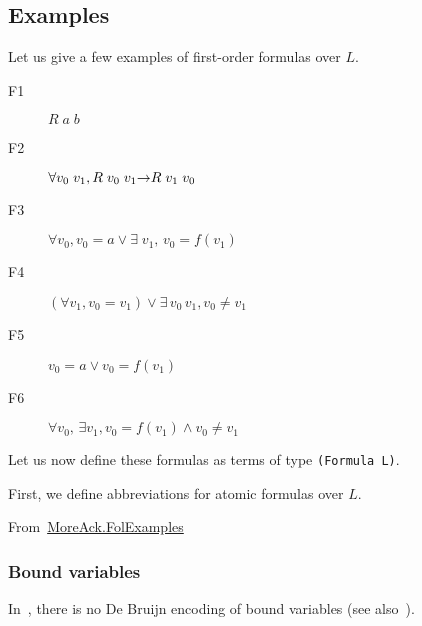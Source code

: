 \subsection{Examples}




Let us give a few examples of first-order formulas over $L$.
\label{fol:examplesf1f2f3}
\begin{description}
\item[F1] $R\;a\;b$
\item[F2] $\forall v_0\; v_1, R\;v_0\;v_1 \mbox{$\rightarrow$} R\;v_1\;v_0$
\item[F3] $ \forall v_0, v_0=a \vee \exists\;v_1,\, v_0= f(v_1)$
\item[F4] $(\forall v_1, v_0 = v_1) \vee \exists\,v_0\,v_1, v_0 \not= v_1$
\item[F5] $v_0 =a \vee v_0 = f(v_1)$
 \item[F6] $\forall v_0,\,\exists v_1, v_0= f(v_1)\wedge v_0\not= v_1$
\end{description}

Let us now define these formulas as terms of type
\texttt{(Formula L)}.

First, we define abbreviations for atomic formulas over $L$.

\noindent From~\href{../theories/html/hydras.MoreAck.FolExamples.html}{MoreAck.FolExamples}


\label{sec:fol-atomic-notations}
\label{sect:folFormExamples}














\subsubsection{Bound variables}

In~\cite{Goedel}, there is no De Bruijn encoding of bound variables (see also~\cite{OConnor05}).

